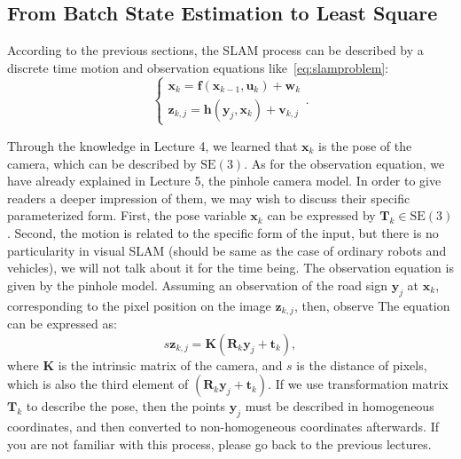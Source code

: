 \subsection{From Batch State Estimation to Least Square}
According to the previous sections, the SLAM process can be described by a discrete time motion and observation equations like~\eqref{eq:slamproblem}:
\begin{equation}
\left\{ \begin{array}{l}
{\mathbf{x}_k} = \mathbf{f}\left( {{\mathbf{x}_{k - 1}},{\mathbf{u}_k}} \right) + \mathbf{w}_k\\
{\mathbf{z}_{k,j}} = \mathbf{h}\left( {{ \mathbf{y}_j},{ \mathbf{x}_k}}  \right)+ \mathbf{v}_{k,j}
\end{array} \right. .
\end{equation}

Through the knowledge in Lecture 4, we learned that $ \mathbf {x} _k $ is the pose of the camera, which can be described by $ \mathrm {SE} (3) $. As for the observation equation, we have already explained in Lecture 5, the pinhole camera model. In order to give readers a deeper impression of them, we may wish to discuss their specific parameterized form. First, the pose variable $\mathbf {x} _k $ can be expressed by $\mathbf {T} _k \in \mathrm {SE} (3) $. Second, the motion is related to the specific form of the input, but there is no particularity in visual SLAM (should be same as the case of ordinary robots and vehicles), we will not talk about it for the time being. The observation equation is given by the pinhole model. Assuming an observation of the road sign $ \mathbf {y} _j $ at $ \mathbf {x} _k $, corresponding to the pixel position on the image $ \mathbf {z} _ {k, j} $, then, observe The equation can be expressed as:
\begin{equation}
s \mathbf{z}_{k,j}= \mathbf{K} (\mathbf{R}_k {\mathbf{y}_j}+\mathbf{t}_k),
\end{equation}
where $ \mathbf {K} $ is the intrinsic matrix of the camera, and $s$ is the distance of pixels, which is also the third element of $ (\mathbf {R} _k {\mathbf {y} _j} + \mathbf {t} _k) $. If we use  transformation matrix $ \mathbf {T} _k $ to describe the pose, then the points $ \mathbf {y} _j $ must be described in homogeneous coordinates, and then converted to non-homogeneous coordinates afterwards. If you are not familiar with this process, please go back to the previous lectures.

